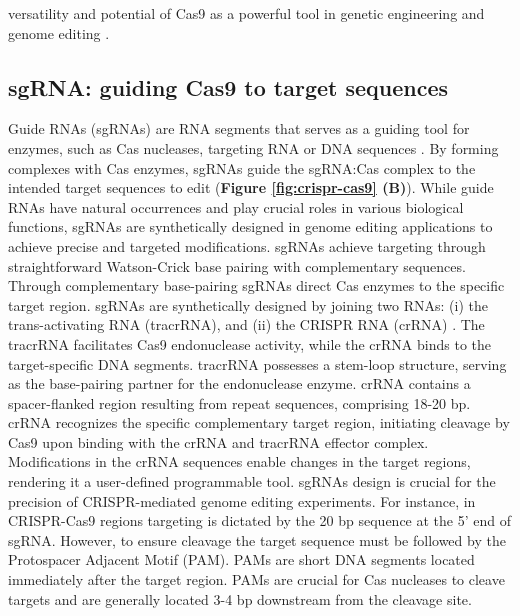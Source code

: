 \documentclass[a4paper, titlepage, openright]{book}
\begin{document}
versatility and potential of Cas9 as a powerful tool in genetic engineering and genome editing \citep{ran2013genome}.

\subsection{sgRNA: guiding Cas9 to target sequences}\label{subsection:sgrna}
Guide RNAs (sgRNAs) are RNA segments that serves as a guiding tool for enzymes, such as Cas nucleases, targeting RNA or DNA sequences \citep{ran2013genome}. By forming complexes with Cas enzymes, sgRNAs guide the sgRNA:Cas complex to the intended target sequences to edit (\textbf{Figure \ref{fig:crispr-cas9} (B)}). While guide RNAs have natural occurrences and play crucial roles in various biological functions, sgRNAs are synthetically designed in genome editing applications to achieve precise and targeted modifications. sgRNAs achieve targeting through straightforward Watson-Crick base pairing with complementary sequences. Through complementary base-pairing sgRNAs direct Cas enzymes to the specific target region. sgRNAs are synthetically designed by joining two RNAs: (i) the trans-activating RNA (tracrRNA), and (ii) the  CRISPR RNA (crRNA) \citep{deltcheva2011crispr}. The tracrRNA facilitates Cas9 endonuclease activity, while the crRNA binds to the target-specific DNA segments. tracrRNA possesses a stem-loop structure, serving as the base-pairing partner for the endonuclease enzyme. crRNA contains a spacer-flanked region resulting from repeat sequences, comprising 18-20 bp. crRNA recognizes the specific complementary target region, initiating cleavage by Cas9 upon binding with the crRNA and tracrRNA effector complex. Modifications in the crRNA sequences enable changes in the target regions, rendering it a user-defined programmable tool. sgRNAs design is crucial for the precision of CRISPR-mediated genome editing experiments. For instance, in CRISPR-Cas9 regions targeting is dictated by the 20 bp sequence at the 5' end of sgRNA. However, to ensure cleavage the target sequence must be followed by the Protospacer Adjacent Motif (PAM). PAMs are short DNA segments located immediately after the target region. PAMs are crucial for Cas nucleases to cleave targets and are generally located 3-4 bp downstream from the cleavage site. 

\end{document}
